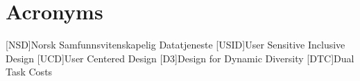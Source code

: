 \chapter*{Acronyms}
\begin{acronym}
[NSD]{Norsk Samfunnsvitenskapelig Datatjeneste}
[USID]{User Sensitive Inclusive Design}
[UCD]{User Centered Design}
[D3]{Design for Dynamic Diversity}
[DTC]{Dual Task Costs}
\end{acronym}